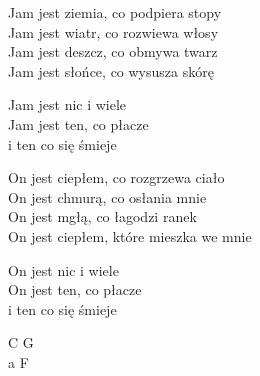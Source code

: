 \begin{text}
    Jam jest ziemia, co podpiera stopy\\
    Jam jest wiatr, co rozwiewa włosy\\
    Jam jest deszcz, co obmywa twarz\\
    Jam jest słońce, co wysusza skórę

    \vin Jam jest nic i wiele\\
    \vin Jam jest ten, co płacze\\
    \vin i ten co się śmieje

    On jest ciepłem, co rozgrzewa ciało\\
    On jest chmurą, co osłania mnie\\
    On jest mgłą, co łagodzi ranek\\
    On jest ciepłem, które mieszka we mnie

    \vin On jest nic i wiele\\
    \vin On jest ten, co płacze\\
    \vin i ten co się śmieje
\end{text}
\begin{chord}
    C G\\
    a F
\end{chord}